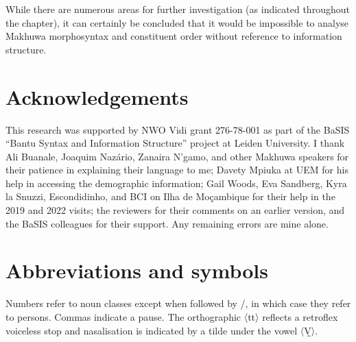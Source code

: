 \documentclass[output=paper]{langscibook}
\begin{document}
While there are numerous areas for further investigation (as indicated throughout the chapter), it can certainly be concluded that it would be impossible to analyse Makhuwa morphosyntax and constituent order without reference to information structure.

\section*{Acknowledgements}

This research was supported by NWO Vidi grant 276-78-001 as part of the BaSIS “Bantu Syntax and Information Structure” project at Leiden University. I thank Ali Buanale, Joaquim Nazário, Zanaira N’gamo, and other Makhuwa speakers for their patience in explaining their language to me; Davety Mpiuka at UEM for his help in accessing the demographic information; Gail Woods, Eva Sandberg, Kyra la Snuzzi, Escondidinho, and BCI on Ilha de Moçambique for their help in the 2019 and 2022 visits;  the reviewers for their comments on an earlier version, and the BaSIS colleagues for their support. Any remaining errors are mine alone.

\section*{Abbreviations and symbols}

Numbers refer to noun classes except when followed by \SG{}/\PL{}, in which case they refer to persons. Commas indicate a pause. The orthographic 〈tt〉 reflects a retroflex voiceless stop and nasalisation is indicated by a tilde under the vowel 〈V̰〉.
\end{document}
